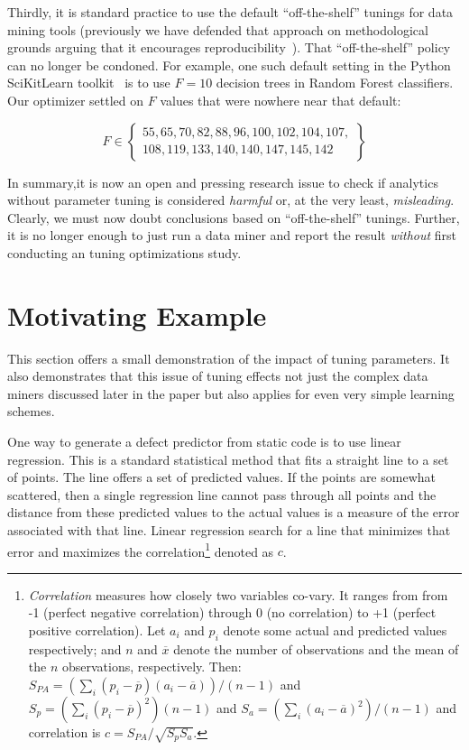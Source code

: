 \documentclass{sig-alternative}
\begin{document}
Thirdly, it is standard practice to use the default ``off-the-shelf'' tunings  for data mining tools (previously
we have defended that approach on methodological grounds arguing that it
encourages reproducibility~\cite{me15:book1}). That ``off-the-shelf''  policy
can no longer be condoned. For example, one such default setting
  in the Python \mbox{SciKitLearn} toolkit~\cite{scikit-learn}
is to use $F=10$ decision trees in  Random Forest classifiers.
Our optimizer settled on  $F$ values that were nowhere near that default:

{\scriptsize
\[F \in \left\{\begin{array}{l} 55,  65, 70,   82, 88, 96, 100,  102,  104, 107,\\
                                108,  119, 133,  140, 140,   147,  145,  142   \end{array}\right\}
\]}


In summary,it is now an open and pressing research issue to check if
analytics without parameter tuning is considered {\em harmful} or, at the 
very least, {\em misleading}.
Clearly, we must now doubt  conclusions based on
``off-the-shelf'' tunings.
Further,
it is no longer enough to just run a data miner and report the result
{\em without} first conducting an tuning optimizations study.

 
 

\section{Motivating Example}\label{sect:eg}

This section offers a small demonstration
of the impact of tuning parameters. It also demonstrates that this issue of tuning effects 
not just the complex data miners discussed later in the paper but also 
applies for even very simple  learning schemes.


One way to generate a  defect predictor from
static code is to use 
linear  regression.
This is a standard statistical
method that fits a straight line to a set of points. The line
offers a set of predicted values.
If the points are somewhat
scattered, then a single regression line cannot pass through all points and the distance from these predicted values to the actual
values is a measure of the error associated with that line.
Linear regression search for a line that minimizes that
error and maximizes the correlation\footnote{
{\em Correlation}
measures how closely two variables co-vary.  It ranges from   from -1
(perfect negative correlation) through 0 (no correlation) to +1
 (perfect positive correlation).
Let  $a_i$ and $p_i$ denote some actual and predicted values respectively; and  $n$ and $\overline{x}$ denote
 the number of observations and the mean of the $n$ observations, 
respectively. Then:
$S_{\mathit{PA}}=(\sum_i (p_i - \overline{p})(a_i -
  \overline{a}))/(n-1)$ and
$S_{p}=(\sum_i (p_i - \overline{p})^2)(n-1)$
and 
$S_{a}=(\sum_i (a_i - \overline{a})^2)/(n-1)$ and
correlation is  $c=S_{\mathit{PA}}/\sqrt{S_pS_a}$.}  denoted as $c$.
\end{document}
